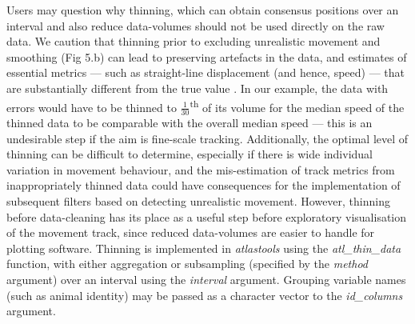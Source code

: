 Users may question why thinning, which can obtain consensus positions over an interval and also reduce data-volumes should not be used directly on the raw data.
We caution that thinning prior to excluding unrealistic movement and smoothing (Fig 5.b) can lead to preserving artefacts in the data, and estimates of essential metrics --- such as straight-line displacement (and hence, speed) --- that are substantially different from the true value \citep[see Fig.~\ref{preproc_fig_05}.c;][]{noonan2019}.
In our example, the data with errors would have to be thinned to $\frac{1}{30}$\textsuperscript{th} of its volume for the median speed of the thinned data to be comparable with the overall median speed --- this is an undesirable step if the aim is fine-scale tracking.
Additionally, the optimal level of thinning can be difficult to determine, especially if there is wide individual variation in movement behaviour, and the mis-estimation of track metrics from inappropriately thinned data could have consequences for the implementation of subsequent filters based on detecting unrealistic movement.
However, thinning before data-cleaning has its place as a useful step before exploratory visualisation of the movement track, since reduced data-volumes are easier to handle for plotting software.
%
Thinning is implemented in \textit{atlastools} using the \textit{atl\_thin\_data} function, with either aggregation or subsampling (specified by the \textit{method} argument) over an interval using the \textit{interval} argument.
Grouping variable names (such as animal identity) may be passed as a character vector to the \textit{id\_columns} argument.


